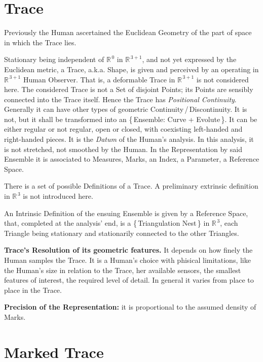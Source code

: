 \documentclass[12pt]{article} %
\begin{document}
\section{Trace}

\noindent Previously the Human ascertained the Euclidean Geometry of the part of space in which the Trace lies. 

\noindent Stationary being independent of $\mathbb{R}^{\,0}$ in $\mathbb{R}^{\,3+1}$, and not yet expressed by the Euclidean metric, a Trace, a.k.a. Shape, is given and perceived by an operating in $\mathbb{R}^{\,3+1}$ Human Observer. That is, a deformable Trace in $\mathbb{R}^{\,3+1}$ is not considered here.
The considered Trace is not a Set of disjoint Points; its Points are sensibly connected into the Trace itself. Hence the Trace has \textsl{Positional Continuity}. Generally it can have other types of geometric Continuity\,/\,Discontinuity. It is not, but it shall be transformed into an \{\,Ensemble: Curve + Evolute\,\}. It can be either regular or not regular, open or closed, with coexisting left-handed and right-handed pieces.  It is the \textsl{Datum} of the Human's analysis. In this analysis, it is not stretched, not smoothed by the Human. In the Representation by said Ensemble it is associated to Measures, Marks, an Index, a Parameter, a Reference Space.

\noindent There is a set of possible Definitions of a Trace.
A preliminary extrinsic definition in $\mathbb{R}^{\,3}$ is not introduced here.

\noindent An Intrinsic Definition of the ensuing Ensemble is given by a Reference Space, that, completed at the analysis' end, is a \{\,Triangulation Nest\,\} in $\mathbb{R}^{\,3}$, each Triangle being stationary and stationarily connected to the other Triangles.  

\noindent \textbf{Trace's Resolution of its geometric features.} It depends on how finely the Human samples the Trace. It is a Human's choice with phisical limitations, like the Human's size in relation to the Trace, her available sensors, the smallest features of interest, the required level of detail. In general it varies from place to place in the Trace.

\noindent \textbf{Precision of the Representation:} it is proportional to the assumed density of Marks.  

\section{Marked Trace}
\end{document}
